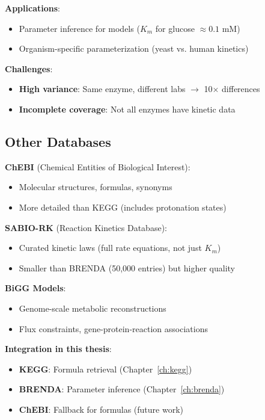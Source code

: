 \textbf{Applications}:

\begin{itemize}
    \item Parameter inference for models ($K_m$ for glucose $\approx 0.1$ mM)
    \item Organism-specific parameterization (yeast vs. human kinetics)
\end{itemize}

\textbf{Challenges}:

\begin{itemize}
    \item \textbf{High variance}: Same enzyme, different labs $\to$ 10$\times$ differences
    \item \textbf{Incomplete coverage}: Not all enzymes have kinetic data
\end{itemize}

\subsection{Other Databases}
\label{subsec:other-databases}

\textbf{ChEBI} (Chemical Entities of Biological Interest):

\begin{itemize}
    \item Molecular structures, formulas, synonyms
    \item More detailed than KEGG (includes protonation states)
\end{itemize}

\textbf{SABIO-RK} (Reaction Kinetics Database):

\begin{itemize}
    \item Curated kinetic laws (full rate equations, not just $K_m$)
    \item Smaller than BRENDA (50,000 entries) but higher quality
\end{itemize}

\textbf{BiGG Models}:

\begin{itemize}
    \item Genome-scale metabolic reconstructions
    \item Flux constraints, gene-protein-reaction associations
\end{itemize}

\textbf{Integration in this thesis}:

\begin{itemize}
    \item \textbf{KEGG}: Formula retrieval (Chapter~\ref{ch:kegg})
    \item \textbf{BRENDA}: Parameter inference (Chapter~\ref{ch:brenda})
    \item \textbf{ChEBI}: Fallback for formulas (future work)
\end{itemize}

